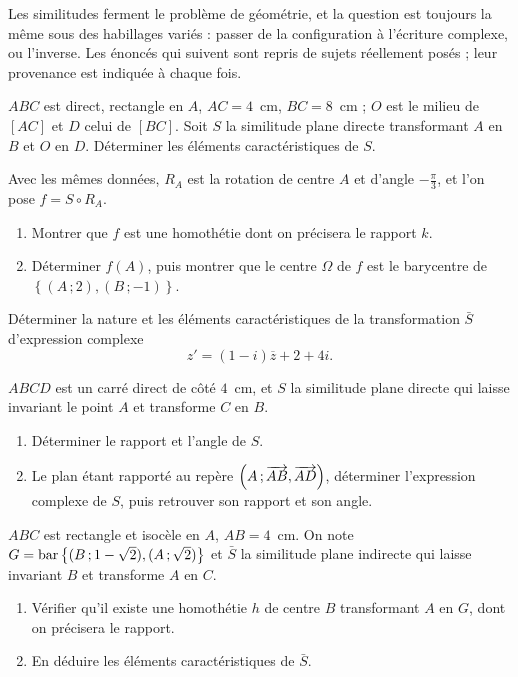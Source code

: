 \begin{annales}
Les similitudes ferment le problème de géométrie, et la question est toujours
la même sous des habillages variés : passer de la configuration à l'écriture
complexe, ou l'inverse. Les énoncés qui suivent sont repris de sujets
réellement posés ; leur provenance est indiquée à chaque fois.

$ABC$ est direct, rectangle en $A$, $AC = 4$~cm, $BC = 8$~cm ; $O$ est le
milieu de $[AC]$ et $D$ celui de $[BC]$. Soit $S$ la similitude plane directe
transformant $A$ en $B$ et $O$ en $D$. Déterminer les éléments
caractéristiques de $S$.

Avec les mêmes données, $R_{A}$ est la rotation de centre $A$ et d'angle
$-\frac{\pi}{3}$, et l'on pose $f = S \circ R_{A}$.
\begin{enumerate}[label=\textbf{\alph*)}, leftmargin=*, itemsep=0.15em]
  \item Montrer que $f$ est une homothétie dont on précisera le rapport $k$.
  \item Déterminer $f(A)$, puis montrer que le centre $\Omega$ de $f$ est le
        barycentre de $\left\{(A\,;2),(B\,;-1)\right\}$.
\end{enumerate}

Déterminer la nature et les éléments caractéristiques de la transformation
$\bar S$ d'expression complexe
\[
  z' = (1-i)\overline z+2+4i .
\]

$ABCD$ est un carré direct de côté $4$~cm, et $S$ la similitude plane directe
qui laisse invariant le point $A$ et transforme $C$ en $B$.
\begin{enumerate}[label=\textbf{\alph*)}, leftmargin=*, itemsep=0.15em]
  \item Déterminer le rapport et l'angle de $S$.
  \item Le plan étant rapporté au repère
        $\left(A\,;\overrightarrow{AB},\overrightarrow{AD}\right)$, déterminer l'expression
        complexe de $S$, puis retrouver son rapport et son angle.
\end{enumerate}

$ABC$ est rectangle et isocèle en $A$, $AB = 4$~cm. On note
$G = \operatorname{bar}\left\{(B\,;1-\sqrt2),(A\,;\sqrt2)\right\}$ et $\bar S$ la similitude plane
indirecte qui laisse invariant $B$ et transforme $A$ en $C$.
\begin{enumerate}[label=\textbf{\alph*)}, leftmargin=*, itemsep=0.15em]
  \item Vérifier qu'il existe une homothétie $h$ de centre $B$ transformant
        $A$ en $G$, dont on précisera le rapport.
  \item En déduire les éléments caractéristiques de $\bar S$.
\end{enumerate}


\end{annales}
